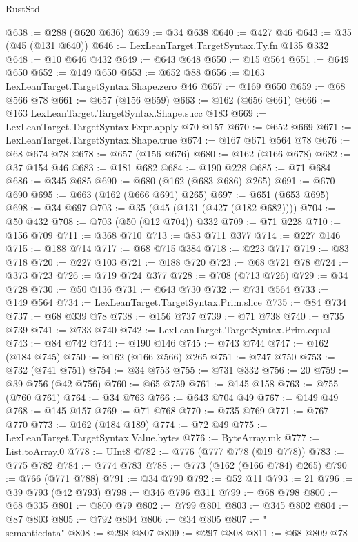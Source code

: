 \begin{lexlean}{RustStd}
\begin{coremodule}
{{@638 := @288 (@620 @636)
@639 := @34 @638
@640 := @427 @46
@643 := @35 (@45 (@131 @640))
@646 := LexLeanTarget.TargetSyntax.Ty.fn @135 @332
@648 := @10 @646 @432
@649 := @643 @648
@650 := @15 @564
@651 := @649 @650
@652 := @149 @650
@653 := @652 @88
@656 := @163 LexLeanTarget.TargetSyntax.Shape.zero @46
@657 := @169 @650
@659 := @68 @566 @78
@661 := @657 (@156 @659)
@663 := @162 (@656 @661)
@666 := @163 LexLeanTarget.TargetSyntax.Shape.succ @183
@669 := LexLeanTarget.TargetSyntax.Expr.apply @70 @157
@670 := @652 @669
@671 := LexLeanTarget.TargetSyntax.Shape.true
@674 := @167 @671 @564 @78
@676 := @68 @674 @78
@678 := @657 (@156 @676)
@680 := @162 (@166 @678)
@682 := @37 @154 @46
@683 := @181 @682
@684 := @190 @228
@685 := @71 @684
@686 := @345 @685
@690 := @680 (@162 (@683 @686) @265)
@691 := @670 @690
@695 := @663 (@162 (@666 @691) @265)
@697 := @651 (@653 @695)
@698 := @34 @697
@703 := @35 (@45 (@131 (@427 (@182 @682))))
@704 := @50 @432
@708 := @703 (@50 (@12 @704)) @332
@709 := @71 @228
@710 := @156 @709
@711 := @368 @710
@713 := @83 @711 @377
@714 := @227 @146
@715 := @188 @714
@717 := @68 @715 @384
@718 := @223 @717
@719 := @83 @718
@720 := @227 @103
@721 := @188 @720
@723 := @68 @721 @78
@724 := @373 @723
@726 := @719 @724 @377
@728 := @708 (@713 @726)
@729 := @34 @728
@730 := @50 @136
@731 := @643 @730
@732 := @731 @564
@733 := @149 @564
@734 := LexLeanTarget.TargetSyntax.Prim.slice
@735 := @84 @734
@737 := @68 @339 @78
@738 := @156 @737
@739 := @71 @738
@740 := @735 @739
@741 := @733 @740
@742 := LexLeanTarget.TargetSyntax.Prim.equal
@743 := @84 @742
@744 := @190 @146
@745 := @743 @744
@747 := @162 (@184 @745)
@750 := @162 (@166 @566) @265
@751 := @747 @750
@753 := @732 (@741 @751)
@754 := @34 @753
@755 := @731 @332
@756 := 20
@759 := @39 @756 (@42 @756)
@760 := @65 @759
@761 := @145 @158
@763 := @755 (@760 @761)
@764 := @34 @763
@766 := @643 @704 @49
@767 := @149 @49
@768 := @145 @157
@769 := @71 @768
@770 := @735 @769
@771 := @767 @770
@773 := @162 (@184 @189)
@774 := @72 @49
@775 := LexLeanTarget.TargetSyntax.Value.bytes
@776 := ByteArray.mk
@777 := List.toArray.{0}
@778 := UInt8
@782 := @776 (@777 @778 (@19 @778))
@783 := @775 @782
@784 := @774 @783
@788 := @773 (@162 (@166 @784) @265)
@790 := @766 (@771 @788)
@791 := @34 @790
@792 := @52 @11
@793 := 21
@796 := @39 @793 (@42 @793)
@798 := @346 @796 @311
@799 := @68 @798
@800 := @68 @335
@801 := @800 @79
@802 := @799 @801
@803 := @345 @802
@804 := @87 @803
@805 := @792 @804
@806 := @34 @805
@807 := "\\semanticdata"
@808 := @298 @807
@809 := @297 @808
@811 := @68 @809 @78
}}
\end{coremodule}
\end{lexlean}
